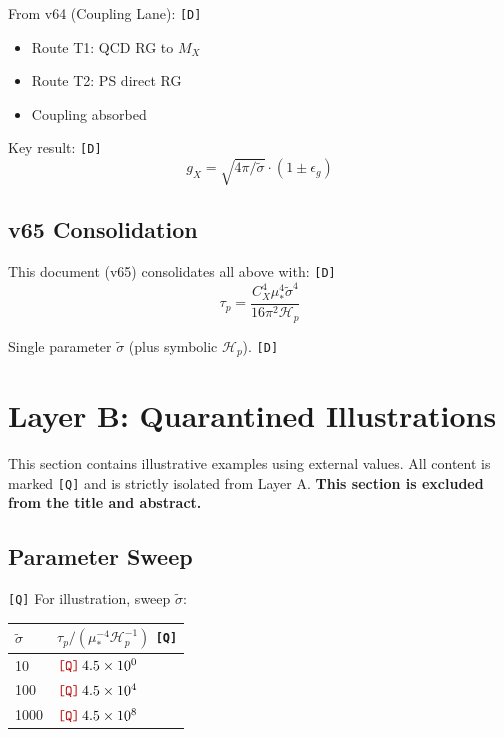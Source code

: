 \documentclass[11pt,a4paper]{article}
\newcommand{\Qnum}[1]{\textcolor{red!70!black}{\texttt{[Q]}}\,#1}
\newcommand{\tagD}{\textcolor{green!50!black}{\texttt{[D]}}}
\newcommand{\tagQ}{\textcolor{red!70!black}{\texttt{[Q]}}}
\theoremstyle{definition}
\begin{document}
From v64 (Coupling Lane): \tagD{}
\begin{itemize}
\item Route T1: QCD RG to $M_X$
\item Route T2: PS direct RG
\item Coupling absorbed
\end{itemize}

Key result: \tagD{}
\begin{equation}
\label{eq:v64-key}
g_X = \sqrt{4\pi/\tilde{\sigma}} \cdot (1 \pm \epsilon_g)
\end{equation}

\subsection{v65 Consolidation}
\label{app:v65-summary}

This document (v65) consolidates all above with: \tagD{}
\begin{equation}
\label{eq:v65-final}
\tau_p = \frac{C_X^4 \mu_*^4 \tilde{\sigma}^4}{16\pi^2 \mathcal{H}_p}
\end{equation}

Single parameter $\tilde{\sigma}$ (plus symbolic $\mathcal{H}_p$). \tagD{}

\newpage
\section{Layer B: Quarantined Illustrations}
\label{sec:layer-b}


\begin{quarantinebox}
This section contains illustrative examples using external values.
All content is marked \tagQ{} and is strictly isolated from Layer A.
\textbf{This section is excluded from the title and abstract.}
\end{quarantinebox}

\subsection{Parameter Sweep}
\label{subsec:sweep}

\tagQ{} For illustration, sweep $\tilde{\sigma}$:
\begin{center}
\begin{tabular}{ll}
\toprule
$\tilde{\sigma}$ & $\tau_p / (\mu_*^{-4} \mathcal{H}_p^{-1})$ \tagQ{} \\
\midrule
10 & $\Qnum{4.5 \times 10^{0}}$ \\
100 & $\Qnum{4.5 \times 10^{4}}$ \\
1000 & $\Qnum{4.5 \times 10^{8}}$ \\
\bottomrule
\end{tabular}
\end{center}
\end{document}
